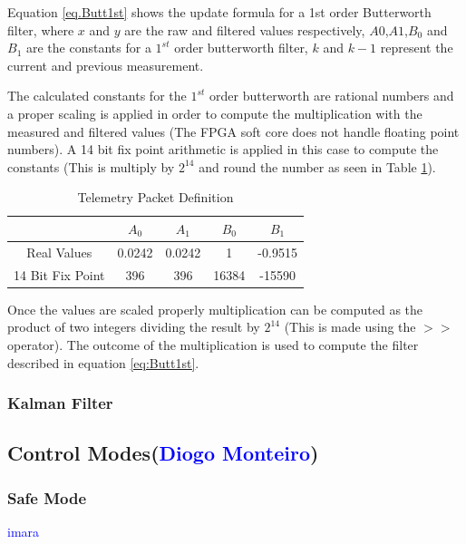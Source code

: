 \documentclass{article}
\newcommand\todo[1]{\textcolor{blue}{#1}} %
\begin{document}
Equation \ref{eq.Butt1st} shows the update formula for a 1st order Butterworth filter, where $x$ and $y$ are the raw and filtered values respectively, $A0$,$A1$,$B_0$ and $B_1$ are the constants for a $1^{st}$ order butterworth filter, $k$ and $k-1$ represent the current and previous measurement.

The calculated constants for the $1^{st}$ order butterworth are rational numbers and a proper scaling is applied in order to compute the multiplication with the measured and filtered values (The FPGA soft core does not handle floating point numbers). A 14 bit fix point arithmetic is applied in this case to compute the constants (This is multiply by $2^14$ and round the number as seen in Table \ref{tbl:ButtConstants}).

\begin{table}[ht]
\centering
\caption{Telemetry Packet Definition}
\begin{tabular}{|c|c|c|c|c|}
\hline 
 & $A_0$ & $A_1$ & $B_0$ & $B_1$ \\ 
\hline 
Real Values & 0.0242 & 0.0242 & 1 & -0.9515 \\ 
\hline 
14 Bit Fix Point & 396 & 396 & 16384 & -15590 \\ 
\hline 
\end{tabular}
\label{tbl:ButtConstants}
\end{table}

Once the values are scaled properly multiplication can be computed as the product of two integers dividing the result by $2^14$ (This is made using the $>>$ operator). The outcome of the multiplication is used to compute the filter described in equation \ref{eq:Butt1st}.

\subsubsection{Kalman Filter}


\subsection{Control Modes(\todo{Diogo Monteiro})}

\subsubsection{Safe Mode}
\todo{imara}
\end{document}
